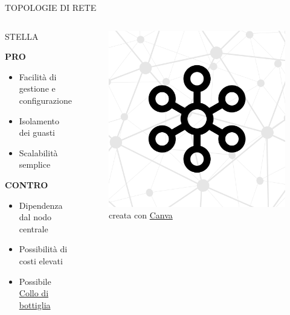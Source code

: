 \documentclass[aspectratio=1610,handout]{beamer}
\begin{document}
\begin{frame}{TOPOLOGIE DI RETE}
    \begin{columns}
            \justifying
            \begin{alertblock}{STELLA}
                \begin{minipage}{0.96\linewidth}
                    \justifying
                    \textbf{PRO}
                    \begin{itemize}
                        \item Facilità di gestione e configurazione
                        \pause
                        \item Isolamento dei guasti
                        \pause
                        \item Scalabilità semplice
                    \end{itemize}
                    \pause
                    \textbf{CONTRO}
                    \begin{itemize}
                        \item Dipendenza dal nodo centrale
                        \pause
                        \item Possibilità di costi elevati
                        \pause
                        \item Possibile \href{https://it.wikipedia.org/wiki/Collo\_di\_bottiglia\_(ingegneria)}{Collo di bottiglia}
                    \end{itemize}
                \end{minipage}
            \end{alertblock}
            \begin{figure}
                \includegraphics[width=\linewidth]{img/stella.png}
                \caption{{creata con \href{https://www.canva.com/}{Canva}}}
            \end{figure}
    \end{columns}
\end{frame}
\end{document}
